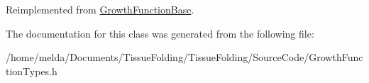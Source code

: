 Reimplemented from \hyperlink{classGrowthFunctionBase_a73b474a60caeb5b6b326ecb6a056cfe4}{Growth\+Function\+Base}.



The documentation for this class was generated from the following file\+:\begin{DoxyCompactItemize}
\item 
/home/melda/\+Documents/\+Tissue\+Folding/\+Tissue\+Folding/\+Source\+Code/Growth\+Function\+Types.\+h\end{DoxyCompactItemize}
